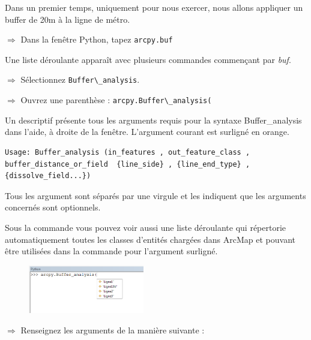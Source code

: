 \documentclass[11pt]{article}
\newcommand{\action}{$\Rightarrow$ }
\newcommand{\code}[1]{\lstinline{#1}}
\begin{document}
Dans un premier temps, uniquement pour nous exercer, nous allons appliquer un buffer de 20m à la ligne de métro.

\action Dans la fenêtre Python, tapez \code{arcpy.buf}

Une liste déroulante apparaît avec plusieurs commandes commençant par \textit{buf}.

\action Sélectionnez \code{Buffer\_analysis}.

\action Ouvrez une parenthèse : \code{arcpy.Buffer\_analysis(}

Un descriptif présente tous les arguments requis pour la syntaxe Buffer\_analysis dans l’aide, à droite de la fenêtre. L'argument courant est surligné en orange.
\begin{lstlisting}
Usage: Buffer_analysis (in_features , out_feature_class , buffer_distance_or_field  {line_side} , {line_end_type} , {dissolve_field...})
\end{lstlisting}

Tous les argument sont séparés par une virgule et les {} indiquent que les arguments concernés sont optionnels. 

Sous la commande vous pouvez voir aussi une liste déroulante qui répertorie automatiquement toutes les classes d'entités chargées dans ArcMap et pouvant être utilisées dans la commande pour l'argument surligné. 
\begin{figure}[H]
	\center \includegraphics[width=0.45\textwidth]{img/td3/python_console_aide.png}\\
\end{figure}

\action Renseignez les arguments de la manière suivante :
\end{document}
